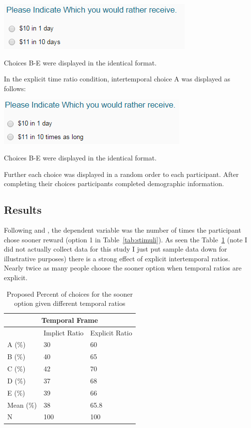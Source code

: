 \documentclass[]{article}
\begin{document}
\includegraphics[]{study1_implicit}

Choices B-E were displayed in the identical format. 

In the explicit time ratio condition, intertemporal choice A was displayed as follows:

\includegraphics[]{study1_explicit}

Choices B-E were displayed in the identical format. 

Further each choice was displayed in a random order to each participant. 
After completing their choices participants completed demographic information.


\subsection{Results}

Following  and , the dependent variable was the number of times the participant chose sooner reward (option 1 in Table~\ref{tab:stimuli}). 
As seen the Table~\ref{tab:study1results} (note I did not actually collect data for this study I just put sample data down for illustrative purposes) there is a strong effect of explicit intertemporal ratios. 
Nearly twice as many people choose the sooner option when temporal ratios are explicit.




\begin{table}[!ht]
	\caption{Proposed Percent of choices for the sooner option given different temporal ratios} 
	\label{tab:study1results}
\begin{tabular}{ p{3cm}||p{3cm}|p{3cm}  }
	\multicolumn{3}{|c|}{Temporal Frame} \\
	\hline
	 & Implict Ratio & Explicit Ratio\\
	\hline
	A (\%)	 & 30  & 60\\
	B (\%) 	 & 40  & 65   \\
	C (\%) 	 & 42  & 70\\
	D (\%)   & 37  & 68\\
	E (\%)   & 39  & 66\\
	Mean (\%) & 38  & 65.8 \\
	N  	 & 100  & 100\\
	\hline
	
\end{tabular}
\end{table}
\end{document}
